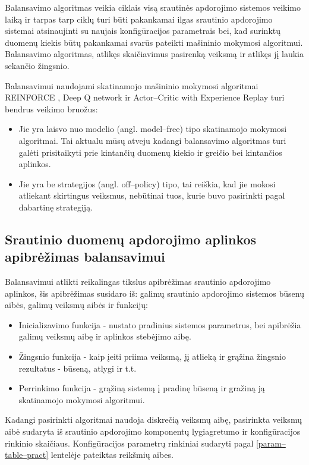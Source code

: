 \documentclass{VUMIFPSbakalaurinis}
\begin{document}
Balansavimo algoritmas veikia ciklais visą srautinės apdorojimo sistemos veikimo laiką ir tarpas tarp ciklų turi būti pakankamai ilgas srautinio apdorojimo sistemai atsinaujinti su naujais konfigūracijos parametrais bei, kad surinktų duomenų kiekis būtų pakankamai svarūs pateikti mašininio mokymosi algoritmui. Balansavimo algoritmas, atlikęs skaičiavimus pasirenką veiksmą ir atlikęs jį laukia sekančio žingsnio. 

Balansavimui naudojami skatinamojo mašininio mokymosi algoritmai REINFORCE \cite{williams1992simple}, Deep Q network \cite{fan2020theoretical} ir Actor–Critic with Experience Replay \cite{wang2016sample} turi bendrus veikimo bruožus:
\begin{itemize}
    \item Jie yra laisvo nuo modelio (angl. model–free) tipo skatinamojo mokymosi algoritmai. Tai aktualu mūsų atveju kadangi balansavimo algoritmas turi galėti prisitaikyti prie kintančių duomenų kiekio ir greičio bei kintančios aplinkos.
    \item Jie yra be strategijos (angl. off–policy) tipo, tai reiškia, kad jie mokosi atliekant skirtingus veiksmus, nebūtinai tuos, kurie buvo pasirinkti pagal dabartinę strategiją.
\end{itemize} 

\subsection{Srautinio duomenų apdorojimo aplinkos apibrėžimas balansavimui}

Balansavimui atlikti reikalingas tikslus apibrėžimas srautinio apdorojimo aplinkos, šis apibrėžimas susidaro iš: galimų srautinio apdorojimo sistemos būsenų aibės, galimų veiksmų aibės ir funkcijų:
\begin{itemize}
    \item Inicializavimo funkcija - nustato pradinius sistemos parametrus, bei apibrėžia galimų veiksmų aibę ir aplinkos stebėjimo aibę.
    \item Žingsnio funkcija - kaip įeiti priima veiksmą, jį atlieką ir grąžina žingsnio rezultatus - būseną, atlygi ir t.t.
    \item Perrinkimo funkcija - grąžiną sistemą į pradinę būseną ir gražiną ją skatinamojo mokymosi algoritmui.
\end{itemize}

Kadangi pasirinkti algoritmai naudoja diskrečią veiksmų aibę, pasirinkta veiksmų aibė sudaryta iš srautinio apdorojimo komponentų lygiagretumo ir konfigūracijos rinkinio skaičiaus. Konfigūracijos parametrų rinkiniai sudaryti pagal \ref{param–table–pract} lentelėje pateiktas reikšmių aibes.
\end{document}
